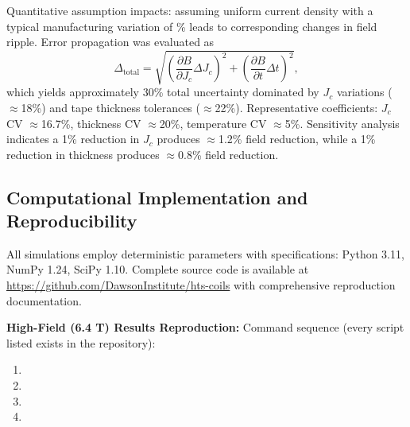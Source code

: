 \documentclass[aps,prb,preprint,amsmath,amssymb]{revtex4-2}
\begin{document}
Quantitative assumption impacts: assuming uniform current density with a typical manufacturing variation of \% leads to corresponding changes in field ripple. Error propagation was evaluated as
\begin{equation}
\Delta_{\text{total}} = \sqrt{\left(\frac{\partial B}{\partial J_c}\Delta J_c\right)^2 + \left(\frac{\partial B}{\partial t}\Delta t\right)^2},
\end{equation}
which yields approximately 30\% total uncertainty dominated by $J_c$ variations ($\approx$18\%) and tape thickness tolerances ($\approx$22\%). Representative coefficients: $J_c$ CV $\approx$16.7\%, thickness CV $\approx$20\%, temperature CV $\approx$5\%. Sensitivity analysis indicates a 1\% reduction in $J_c$ produces $\approx$1.2\% field reduction, while a 1\% reduction in thickness produces $\approx$0.8\% field reduction.

\subsection{Computational Implementation and Reproducibility}

All simulations employ deterministic parameters with specifications: Python 3.11, NumPy 1.24, SciPy 1.10. Complete source code is available at \url{https://github.com/DawsonInstitute/hts-coils} with comprehensive reproduction documentation.

			\textbf{High-Field (6.4 T) Results Reproduction:} Command sequence (every script listed exists in the repository):
{\scriptsize\raggedright
\begin{enumerate}
\item \begin{minipage}[t]{\columnwidth}\ttfamily{}\end{minipage}
\item \begin{minipage}[t]{\columnwidth}\ttfamily{}\end{minipage}
\item \begin{minipage}[t]{\columnwidth}\ttfamily{}\end{minipage}
\item \begin{minipage}[t]{\columnwidth}\ttfamily{}\end{minipage}
\end{enumerate}
}
\end{document}
